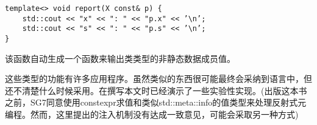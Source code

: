 \begin{lstlisting}[style=styleCXX]
template<> void report(X const& p) {
	std::cout << "x" << ": " << "p.x" << ’\n’;
	std::cout << "s" << ": " << "p.s" << ’\n’;
}
\end{lstlisting}

该函数自动生成一个函数来输出类类型的非静态数据成员值。

这些类型的功能有许多应用程序。虽然类似的东西很可能最终会采纳到语言中，但还不清楚什么时候采用。在撰写本文时已经演示了一些实验性实现。(出版这本书之前，SG7同意使用constexpr求值和类似std::meta::info的值类型来处理反射式元编程。然而，这里提出的注入机制没有达成一致意见，可能会采取另一种方式)

























